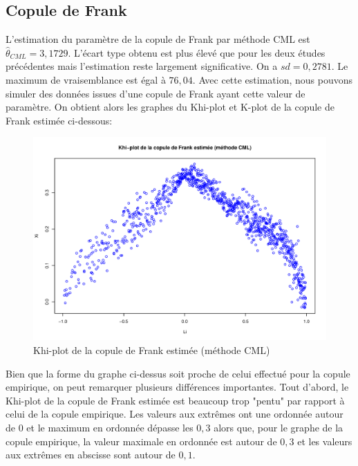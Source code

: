 \subsection{Copule de Frank}

L'estimation du paramètre de la copule de Frank par méthode CML est $\widehat{\theta}_{CML}=3,1729$. L'écart type obtenu est plus élevé que pour les deux études précédentes mais l'estimation reste largement significative. On a $sd = 0,2781$. Le maximum de vraisemblance est égal à $76,04$. Avec cette estimation, nous pouvons simuler des données issues d'une copule de Frank ayant cette valeur de paramètre. On obtient alors les graphes du Khi-plot et K-plot de la copule de Frank estimée ci-dessous:

\noindent%
\begin{figure}[H]
    \begin{center}
      \includegraphics[width=17 cm, angle=0]{./pictures/frankcmlkhiplot.png}
      \centering\caption{\label{2}Khi-plot de la copule de Frank estimée (méthode CML)}
    \end{center}
\end{figure}

Bien que la forme du graphe ci-dessus soit proche de celui effectué pour la copule empirique, on peut remarquer plusieurs différences importantes. Tout d'abord, le Khi-plot de la copule de Frank estimée est beaucoup trop "pentu" par rapport à celui de la copule empirique. Les valeurs aux extrêmes ont une ordonnée autour de $0$ et le maximum en ordonnée dépasse les $0,3$ alors que, pour le graphe de la copule empirique, la valeur maximale en ordonnée est autour de $0,3$ et les valeurs aux extrêmes en abscisse sont autour de $0,1$.


